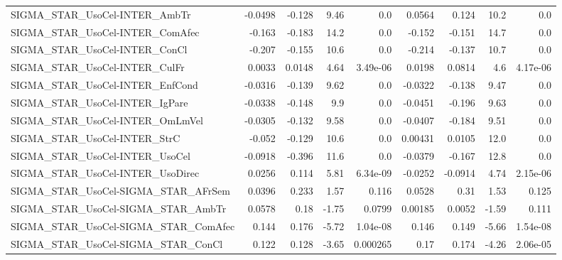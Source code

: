 \begin{tabular}{lrrrrrrrr}
SIGMA\_STAR\_UsoCel-INTER\_AmbTr          &     -0.0498 &       -0.128 &     9.46 &      0.0 &     0.0564 &       0.124 &         10.2 &           0.0 \\
SIGMA\_STAR\_UsoCel-INTER\_ComAfec        &      -0.163 &       -0.183 &     14.2 &      0.0 &     -0.152 &      -0.151 &         14.7 &           0.0 \\
SIGMA\_STAR\_UsoCel-INTER\_ConCl          &      -0.207 &       -0.155 &     10.6 &      0.0 &     -0.214 &      -0.137 &         10.7 &           0.0 \\
SIGMA\_STAR\_UsoCel-INTER\_CulFr          &      0.0033 &       0.0148 &     4.64 & 3.49e-06 &     0.0198 &      0.0814 &          4.6 &      4.17e-06 \\
SIGMA\_STAR\_UsoCel-INTER\_EnfCond        &     -0.0316 &       -0.139 &     9.62 &      0.0 &    -0.0322 &      -0.138 &         9.47 &           0.0 \\
SIGMA\_STAR\_UsoCel-INTER\_IgPare         &     -0.0338 &       -0.148 &      9.9 &      0.0 &    -0.0451 &      -0.196 &         9.63 &           0.0 \\
SIGMA\_STAR\_UsoCel-INTER\_OmLmVel        &     -0.0305 &       -0.132 &     9.58 &      0.0 &    -0.0407 &      -0.184 &         9.51 &           0.0 \\
SIGMA\_STAR\_UsoCel-INTER\_StrC           &      -0.052 &       -0.129 &     10.6 &      0.0 &    0.00431 &      0.0105 &         12.0 &           0.0 \\
SIGMA\_STAR\_UsoCel-INTER\_UsoCel         &     -0.0918 &       -0.396 &     11.6 &      0.0 &    -0.0379 &      -0.167 &         12.8 &           0.0 \\
SIGMA\_STAR\_UsoCel-INTER\_UsoDirec       &      0.0256 &        0.114 &     5.81 & 6.34e-09 &    -0.0252 &     -0.0914 &         4.74 &      2.15e-06 \\
SIGMA\_STAR\_UsoCel-SIGMA\_STAR\_AFrSem    &      0.0396 &        0.233 &     1.57 &    0.116 &     0.0528 &        0.31 &         1.53 &         0.125 \\
SIGMA\_STAR\_UsoCel-SIGMA\_STAR\_AmbTr     &      0.0578 &         0.18 &    -1.75 &   0.0799 &    0.00185 &      0.0052 &        -1.59 &         0.111 \\
SIGMA\_STAR\_UsoCel-SIGMA\_STAR\_ComAfec   &       0.144 &        0.176 &    -5.72 & 1.04e-08 &      0.146 &       0.149 &        -5.66 &      1.54e-08 \\
SIGMA\_STAR\_UsoCel-SIGMA\_STAR\_ConCl     &       0.122 &        0.128 &    -3.65 & 0.000265 &       0.17 &       0.174 &        -4.26 &      2.06e-05 \\

\end{tabular}
